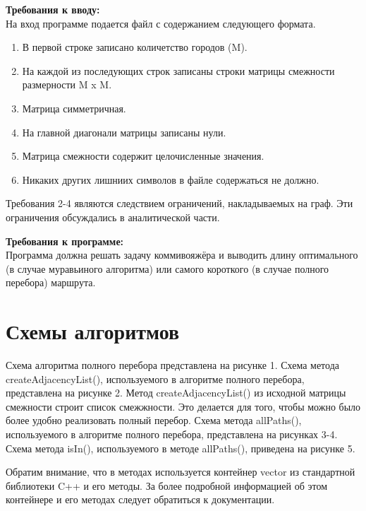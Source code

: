 \documentclass[a4paper,14pt]{report}
\begin{document}
\textbf{Требования к вводу:}\\
На вход программе подается файл с содержанием следующего формата.
\begin{enumerate}
	\item В первой строке записано количетство городов (M).
	\item На каждой из последующих строк записаны строки матрицы смежности размерности M x M.
	\item Матрица симметричная.
	\item На главной диагонали матрицы записаны нули.
	\item Матрица смежности содержит целочисленные значения.
	\item Никаких других лишниих символов в файле содержаться не должно.
\end{enumerate}

Требования 2-4 являются следствием ограничений, накладываемых на граф. Эти ограничения обсуждались в аналитической части.

\textbf{Требования к программе:}\\
Программа должна решать задачу коммивояжёра и выводить длину оптимального (в случае муравьиного алгоритма) или самого короткого (в случае полного перебора) маршрута.

\section*{Схемы алгоритмов}

Схема алгоритма полного перебора представлена на рисунке 1.
Схема метода createAdjacencyList(), используемого в алгоритме полного перебора, представлена на рисунке 2. Метод createAdjacencyList() из исходной матрицы смежности строит список смежжности. Это делается для того, чтобы можно было более удобно реализовать полный перебор.
Схема метода allPaths(), используемого в алгоритме полного перебора, представлена на рисунках 3-4. Схема метода isIn(), используемого в методе allPaths(), приведена на рисунке 5.

Обратим внимание, что в методах используется контейнер vector из стандартной библиотеки C++ и его методы. За более подробной информацией об этом контейнере и его методах следует обратиться к документации.
\end{document}
